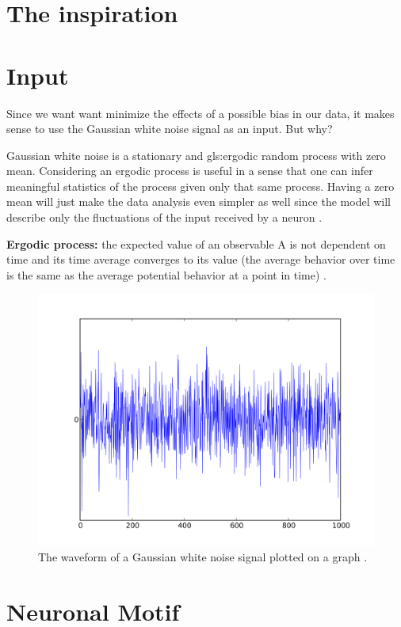 \documentclass[class={myRUCProject}, crop=false]{standalone}
\begin{document}
\section{The inspiration}

\section{Input}
\indent Since we want want minimize the effects of a possible bias in our data, it makes sense to use the Gaussian white noise signal as an input. But why? \newline

\indent Gaussian white noise is a stationary and \gls{gls:ergodic} random process with zero mean. Considering an ergodic process is useful in a sense that one can infer meaningful statistics of the process given only that same process. Having a zero mean will just make the data analysis even simpler as well since the model will describe  only the fluctuations of the input received by a neuron \cite{}.

\textbf{Ergodic process:} the expected value of an observable A is not dependent on time and its time average converges to its value (the average behavior over time is the same as the average potential behavior at a point in time) \cite{}.

\begin{figure}[h]
    \centering
    \includegraphics[width=300 pt]{Pictures/Ana/White_noise.svg.png}
    \caption{The waveform of a Gaussian white noise signal plotted on a graph .} \label{fig:unkown}
\end{figure}

\section{Neuronal Motif}
\end{document}
